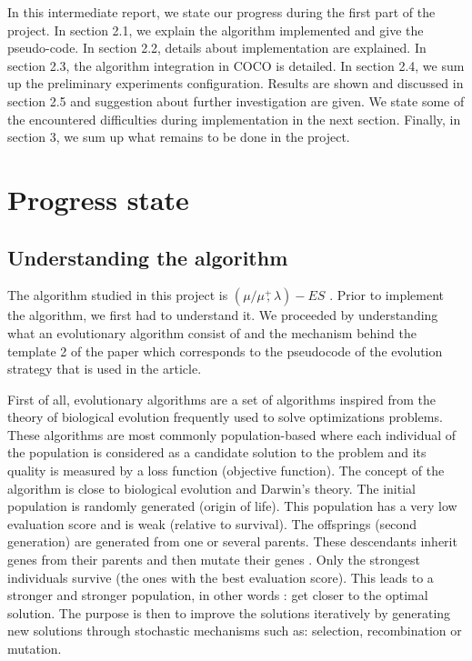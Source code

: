\documentclass{article}
\begin{document}
In this intermediate report, we state our progress during the first part of the project. In section 2.1, we explain the algorithm implemented and give the pseudo-code. In section 2.2, details about implementation are explained. In section 2.3, the algorithm integration in COCO is detailed. In section 2.4, we sum up the preliminary experiments configuration. Results are shown and discussed in section 2.5 and suggestion about further investigation are given. We state some of the encountered difficulties during implementation in the next section. Finally, in section 3, we sum up what remains to be done in the project.


\section{Progress state}

\subsection{Understanding the algorithm}
The algorithm studied in this project is $(\mu / \mu \overset{+}{,} \lambda)-ES$ \cite{DBLP:reference/sp/HansenAA15}. Prior to implement the algorithm, we first had to understand it. We proceeded by understanding what an evolutionary algorithm consist of and the mechanism behind the template 2 of the paper which corresponds to the pseudocode of the evolution strategy that is used in the article.

First of all, evolutionary algorithms are a set of algorithms inspired from the theory of biological evolution frequently used to solve optimizations problems. These algorithms are most commonly population-based where each individual of the population is considered as a candidate solution to the problem and its quality is measured by a loss function (objective function). 
The concept of the algorithm is close to biological evolution and Darwin’s theory. The initial population is randomly generated (origin of life). This population has a very low evaluation score and is weak (relative to survival). The offsprings (second generation) are generated from one or several parents. These descendants inherit genes from their parents and then mutate their genes . Only the strongest individuals survive (the ones with the best evaluation score). This leads to a stronger and stronger population, in other words : get closer to the optimal solution.
The purpose is then to improve the solutions iteratively by generating new solutions through stochastic mechanisms such as: selection, recombination or mutation.  
\end{document}
